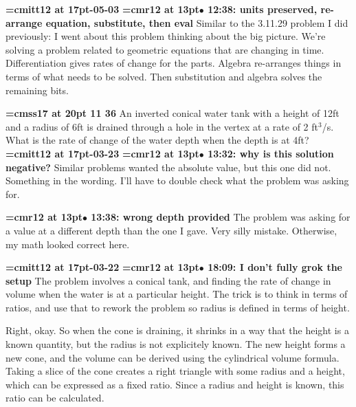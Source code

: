 {\medskip\noindent\bf\font\titlefont=cmitt12 at 17pt-05-03}\medskip
{\smallskip\noindent\bf\font\titlefont=cmr12 at 13pt\titlefont $\bullet$ 12:38: units preserved, re-arrange equation, substitute, then eval}\smallskip
Similar to the 3.11.29 problem I did previously: I went about this problem thinking about the big picture. We're solving a problem related to geometric equations that are changing in time. Differentiation gives rates of change for the parts. Algebra re-arranges things in terms of what needs to be solved. Then substitution and algebra solves the remaining bits.
\par

{\medskip\noindent\bf\font\titlefont=cmss17 at 20pt 11 36}\medskip
An inverted conical water tank with a height of 12ft and
a radius of 6ft is drained through a hole in the vertex
at a rate of 2 ft$^3$/s. What is the rate of change of the
water depth when the depth is at 4ft?
{\medskip\noindent\bf\font\titlefont=cmitt12 at 17pt-03-23}\medskip
{\smallskip\noindent\bf\font\titlefont=cmr12 at 13pt\titlefont $\bullet$ 13:32: why is this solution negative?}\smallskip
Similar problems wanted the absolute value, but this one did not. Something in the wording. I'll have to double check what the problem was asking for.
\par

{\smallskip\noindent\bf\font\titlefont=cmr12 at 13pt\titlefont $\bullet$ 13:38: wrong depth provided}\smallskip
The problem was asking for a value at a different depth than the one I gave. Very silly mistake. Otherwise, my math looked correct here.
\par

{\medskip\noindent\bf\font\titlefont=cmitt12 at 17pt-03-22}\medskip
{\smallskip\noindent\bf\font\titlefont=cmr12 at 13pt\titlefont $\bullet$ 18:09: I don't fully grok the setup}\smallskip
The problem involves a conical tank, and finding the rate of change in volume when the water is at a particular height. The trick is to think in terms of ratios, and use that to rework the problem so radius is defined in terms of height.
\par

Right, okay. So when the cone is draining, it shrinks in a way that the height is a known quantity, but the radius is not explicitely known. The new height forms a new cone, and the volume can be derived using the cylindrical volume formula. Taking a slice of the cone creates a right triangle with some radius and a height, which can be expressed as a fixed ratio. Since a radius and height is known, this ratio can be calculated.
\par

